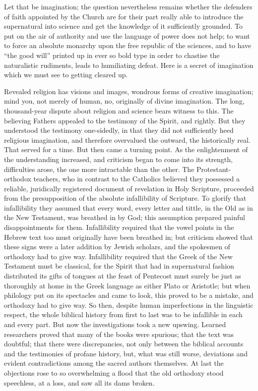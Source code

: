 \documentclass[12pt,a4paper,openany]{book}
\newcommand{\opage}[1]{\marginnote{\footnotesize\textit{[#1]}}}
\begin{document}
Let that be imagination; the question nevertheless remains whether the defenders of faith appointed by the Church are for their part really able to introduce the supernatural into science and get the knowledge of it sufficiently grounded. To put on the air of authority and use the language of power does not help; to want to force an absolute monarchy upon the free republic of the sciences, and to have ``the good will'' printed up in ever so bold type in order to chastise the naturalistic rudiments, leads to humiliating defeat. Here is a secret of imagination which we must see to getting cleared up.

Revealed religion has visions and images, wondrous forms of creative imagination; mind you, not merely of human, no, originally of divine imagination. The long, thousand-year dispute about religion and science bears witness to this. The believing Fathers appealed to the testimony of the Spirit, and rightly. But they understood the testimony one-sidedly, in that they did not sufficiently heed religious imagination, and therefore overvalued the outward, the historically real. That served for a time. But then came a turning point. As the enlightenment of the understanding increased, and criticism began to come into its strength, difficulties arose, the one more intractable than the other. The Protestant-orthodox teachers, who in contrast to the Catholics believed they possessed a reliable, juridically
\setcounter{footnote}{0}%
\opage{33}registered document of revelation in Holy Scripture, proceeded from the presupposition of the absolute infallibility of Scripture. To glorify that infallibility they assumed that every word, every letter and tittle, in the Old as in the New Testament, was breathed in by God; this assumption prepared painful disappointments for them. Infallibility required that the vowel points in the Hebrew text too must originally have been breathed in; but criticism showed that these signs were a later addition by Jewish scholars, and the spokesmen of orthodoxy had to give way. Infallibility required that the Greek of the New Testament must be classical, for the Spirit that had in supernatural fashion distributed its gifts of tongues at the feast of Pentecost must surely be just as thoroughly at home in the Greek language as either Plato or Aristotle; but when philology put on its spectacles and came to look, this proved to be a mistake, and orthodoxy had to give way. So then, despite human imperfections in the linguistic respect, the whole biblical history from first to last was to be infallible in each and every part. But now the investigations took a new upswing. Learned researchers proved that many of the books were spurious; that the text was doubtful; that there were discrepancies, not only between the biblical accounts and the testimonies of profane history, but, what was still worse, deviations and evident contradictions among the sacred authors themselves. At last the objections rose to so overwhelming a flood that the old orthodoxy stood speechless, at a loss, and saw all its dams broken.
\end{document}
